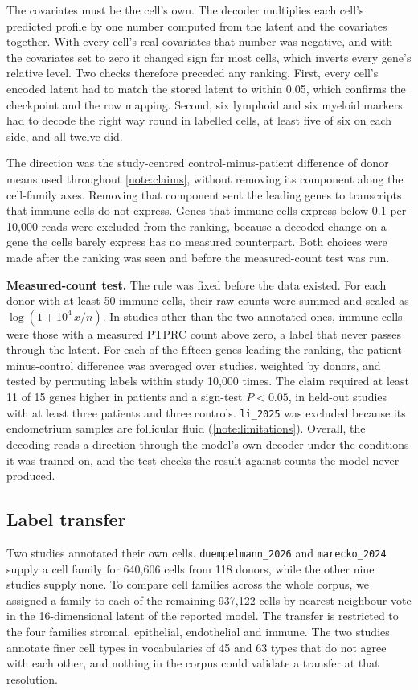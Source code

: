 The covariates must be the cell's own. The decoder multiplies each cell's
predicted profile by one number computed from the latent and the
covariates together. With every cell's real covariates that number was
negative, and with the covariates set to zero it changed sign for most
cells, which inverts every gene's relative level. Two checks therefore
preceded any ranking. First, every cell's encoded latent had to match the
stored latent to within 0.05, which confirms the checkpoint and the row
mapping. Second, six lymphoid and six myeloid markers had to decode the
right way round in labelled cells, at least five of six on each side, and
all twelve did.

The direction was the study-centred control-minus-patient difference of
donor means used throughout \ref{note:claims}, without removing its
component along the cell-family axes. Removing that component sent the
leading genes to transcripts that immune cells do not express. Genes that
immune cells express below 0.1 per 10{,}000 reads were excluded from the
ranking, because a decoded change on a gene the cells barely express has
no measured counterpart. Both choices were made after the ranking was seen
and before the measured-count test was run.

\textbf{Measured-count test.} The rule was fixed before the data existed.
For each donor with at least 50 immune cells, their raw counts were summed and scaled
as $\log(1 + 10^{4}\,x/n)$. In studies other than the two annotated ones,
immune cells were those with a measured PTPRC count above zero, a label
that never passes through the latent. For each of the fifteen genes
leading the ranking, the patient-minus-control difference was averaged
over studies, weighted by donors, and tested by permuting labels within
study 10{,}000 times. The claim required at least 11 of 15 genes higher in
patients and a sign-test $P < 0.05$, in held-out studies with at least
three patients and three controls. \texttt{li\_2025} was excluded because
its endometrium samples are follicular fluid (\ref{note:limitations}).
Overall, the decoding reads a direction through the model's own decoder
under the conditions it was trained on, and the test checks the result
against counts the model never produced.

\subsection{Label transfer}
\label{smeth:transfer}

Two studies annotated their own cells. \texttt{duempelmann\_2026} and
\texttt{marecko\_2024} supply a cell family for 640{,}606 cells from 118
donors, while the other nine studies supply none. To compare cell families
across the whole corpus, we assigned a family to each of the remaining
937{,}122 cells by nearest-neighbour vote in the 16-dimensional latent of
the reported model. The transfer is restricted to the four families
stromal, epithelial, endothelial and immune. The two studies annotate
finer cell types in vocabularies of 45 and 63 types that do not agree
with each other, and nothing in the corpus could validate a transfer at
that resolution.

